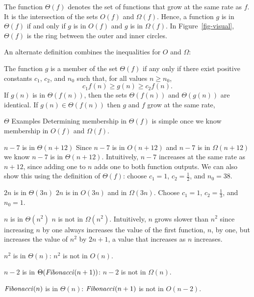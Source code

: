\begin{schemeregion}
The function $\Theta(f)$ denotes the set of functions that grow at the same rate as $f$.  It is the intersection of the sets $O(f)$ and $\Omega(f)$.  Hence, a function $g$ is in $\Theta(f)$ if and only if $g$ is in $O(f)$ and $g$ is in $\Omega(f)$.  In Figure~\ref{fig-visual}, $\Theta(f)$ is the ring between the outer and inner circles.

An alternate definition combines the inequalities for $O$ and $\Omega$:

 The function $g$ is a member of the set $\Theta(f)$ if any only if there exist positive constants $c_1$, $c_2$, and $n_0$ such that, for all values $n \ge n_0$, 
\begin{displaymath}
c_1 f(n) \ge g(n) \ge c_2 f(n).
\end{displaymath}
If $g(n)$ is in $\Theta(f(n))$, then the sets $\Theta(f(n))$ and $\Theta(g(n))$ are identical.   If $g(n) \in \Theta(f(n))$ then $g$ and $f$ grow at the same rate, 

\begin{example}{$\Theta$ Examples}
Determining membership in $\Theta(f)$ is simple once we know membership in $O(f)$ and $\Omega(f)$.
\begin{descriptionlist}
\item[$n-7$ is in $\Theta(n+12)$]\forcenl 
Since $n-7$ is in $O(n+12)$ and $n-7$ is in $\Omega(n+12)$ we know $n-7$ is in $\Theta(n+12)$.  Intuitively, $n-7$ increases at the same rate as $n+12$, since adding one to $n$ adds one to both function outputs.  We can also show this using the definition of $\Theta(f)$: choose $c_1 = 1$, $c_2 = \frac{1}{2}$, and $n_0 = 38$. 
\item[$2n$ is in $\Theta(3n)$]\forcenl $2n$ is in $O(3n)$ and in $\Omega(3n)$.  Choose $c_1 = 1$, $c_2 = \frac{1}{3}$, and $n_0 = 1$.
\item[$n$ is \bold{not} in $\Theta(n^2)$]\forcenl $n$ is not in $\Omega(n^2)$.  Intuitively, $n$ grows slower than $n^2$ since increasing $n$ by one always increases the value of the first function, $n$, by one, but increases the value of $n^2$ by $2n + 1$, a value that increases as $n$ increases.
\item[$n^2$ is \bold{not} in $\Theta(n)$:] $n^2$ is not in $O(n)$.  
\item[$n-2$ is \bold{not} in $\Theta(\textrm{\emph{Fibonacci}}(n+1))$:] $n-2$ is not in $\Omega(n)$.
\item[$\textrm{\emph{Fibonacci}}(n)$ is \bold{not} in $\Theta(n)$:] $\textrm{\emph{Fibonacci}}(n+1)$ is not in $O(n-2)$.
\end{descriptionlist}
\end{example}


\end{schemeregion}

